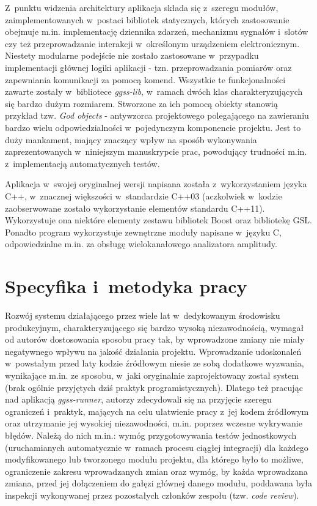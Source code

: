 Z~punktu widzenia architektury aplikacja składa się z~szeregu modułów, zaimplementowanych w~postaci bibliotek statycznych, których zastosowanie obejmuje m.in. implementację dziennika zdarzeń, mechanizmu sygnałów i~slotów czy też przeprowadzanie interakcji w~określonym urządzeniem elektronicznym. Niestety modularne podejście nie zostało zastosowane w~przypadku implementacji głównej logiki aplikacji - tzn. przeprowadzania pomiarów oraz zapewniania komunikacji za pomocą komend. Wszystkie te funkcjonalności zawarte zostały w~bibliotece \emph{ggss-lib}, w~ramach dwóch klas charakteryzujących się bardzo dużym rozmiarem. Stworzone za ich pomocą obiekty stanowią przykład tzw. \emph{God objects} - antywzorca projektowego polegającego na zawieraniu bardzo wielu odpowiedzialności w~pojedynczym komponencie projektu. Jest to duży mankament, mający znaczący wpływ na sposób wykonywania zaprezentowanych w~niniejszym manuskrypcie prac, powodujący trudności m.in. z~implementacją automatycznych testów. 

Aplikacja w~swojej oryginalnej wersji napisana została z~wykorzystaniem języka C++, w~znacznej większości w~standardzie C++03 (aczkolwiek w~kodzie zaobserwowane zostało wykorzystanie elementów standardu C++11). Wykorzystuje ona niektóre elementy zestawu bibliotek Boost oraz bibliotekę GSL. Ponadto program wykorzystuje zewnętrzne moduły napisane w~języku C, odpowiedzialne m.in. za obsługę wielokanałowego analizatora amplitudy.

\clearpage
\section{Specyfika i~metodyka pracy}
Rozwój systemu działającego przez wiele lat w~dedykowanym środowisku produkcyjnym, charakteryzującego się bardzo wysoką niezawodnością, wymagał od autorów dostosowania sposobu pracy tak, by wprowadzone zmiany nie miały negatywnego wpływu na jakość działania projektu. Wprowadzanie udoskonaleń w~powstałym przed laty kodzie źródłowym niesie ze sobą dodatkowe wyzwania, wynikające m.in. ze sposobu, w~jaki oryginalnie zaprojektowany został system (brak ogólnie przyjętych dziś praktyk programistycznych). Dlatego też pracując nad aplikacją \emph{ggss-runner}, autorzy zdecydowali się na przyjęcie szeregu ograniczeń i~praktyk, mających na celu ułatwienie pracy z~jej kodem źródłowym oraz utrzymanie jej wysokiej niezawodności, m.in. poprzez wczesne wykrywanie błędów. Należą do nich m.in.: wymóg przygotowywania testów jednostkowych (uruchamianych automatycznie w~ramach procesu ciągłej integracji) dla każdego modyfikowanego lub tworzonego modułu projektu, dla którego było to możliwe, ograniczenie zakresu wprowadzanych zmian oraz wymóg, by każda wprowadzana zmiana, przed jej dołączeniem do gałęzi głównej danego modułu, poddawana była inspekcji wykonywanej przez pozostałych członków zespołu (tzw. \emph{code review}).



